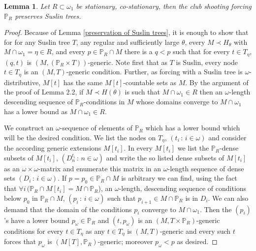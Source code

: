 \documentclass[10pt,a4paper]{amsart}
\newtheorem{lemma}{Lemma}
\newcommand{\forceP}{\mathbb{P}}
\begin{document}
\begin{lemma}
Let $R \subset \omega_1$ be stationary, co-stationary, then the club shooting forcing $\forceP_R$ preserves Suslin trees.
\end{lemma}

\begin{proof}
Because of Lemma \ref{preservation of Suslin trees}, it is enough to show that for for any Suslin tree $T$, any regular and sufficiently large
 $\theta$, every $M \prec H_{\theta}$ with $M \cap \omega_1 = \eta \in R$, and every
 $p \in \forceP_R \cap M$ there is a $q<p$ such that for every
 $t \in T_{\eta}$, $(q,t)$ is $(M,(\forceP_R \times T))$-generic.
 Note first that as $T$ is Suslin, every node $t \in T_{\eta}$ is an
 $(M,T)$-generic condition. Further, as forcing with a Suslin tree
 is $\omega$-distributive, $M[t]$ has the same $M[t]$-countable sets as $M$.
 By the argument of the proof of Lemma 2.2, if $M\prec H(\theta)$ is such
 that $M \cap \omega_1 \in R$ then an $\omega$-length descending sequence
 of $\forceP_R$-conditions in $M$ whose domains converge to $M \cap \omega_1$
 has a lower bound as $M \cap \omega_1 \in R$.
 
 We construct an $\omega$-sequence of elements of $\forceP_R$ which has a lower bound
 which will be the desired condition. 
 We list the nodes on $T_{\eta}$, $(t_i \, : \, i \in \omega)$ and
 consider the according generic extensions $M[t_i]$.
 In every $M[t_i]$ we list the $\forceP_R$-dense subsets of $M[t_i]$,
 $(D^{t_i}_n \, : \, n \in \omega)$ and write 
 the so listed dense subsets of $M[t_i]$ as an $\omega \times \omega$-matrix and enumerate
 this matrix in an $\omega$-length sequence of dense sets $(D_i \, : \, i \in \omega)$.
 If $p=p_0 \in \forceP_R \cap M$ is arbitrary we can find, using the fact that $\forall i \, (\forceP_R \cap M[t_i] = M \cap \forceP_R$), an $\omega$-length, descending
 sequence of conditions below $p_0$ in $\forceP_R \cap M$, $(p_i \, : \, i \in \omega)$
 such that $p_{i+1} \in M \cap \forceP_R$ is in $D_i$.
 We can also demand that the domain of the conditions $p_i$ converge to $M \cap \omega_1$.
 Then the $(p_i)$'s have a lower bound $p_{\omega} \in \forceP_R$ and $(t, p_{\omega})$ is an
 $(M, T \times \forceP_R)$-generic conditions for every $t \in T_{\eta}$ as any $t \in T_{\eta}$ is $(M,T)$-generic
 and every such $t$ forces that $p_{\omega}$ is $(M[T], \forceP_R)$-generic; moreover $p_{\omega} < p$ as 
 desired.
 \end{proof}
\end{document}
